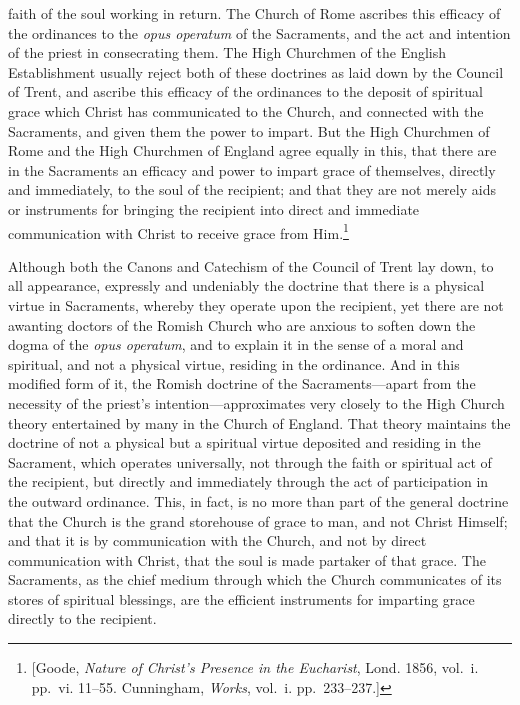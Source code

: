 \documentclass[english,]{book}
\begin{document}
faith of the soul working in return. The Church of Rome ascribes this efficacy of the ordinances to the \emph{opus operatum} of the Sacraments, and the act and intention of the priest in consecrating them. The High Churchmen of the English Establishment usually reject both of these doctrines as laid down by the Council of Trent, and ascribe this efficacy of the ordinances to the deposit of spiritual grace which Christ has communicated to the Church, and connected with the Sacraments, and given them the power to impart. But the High Churchmen of Rome and the High Churchmen of England agree equally in this, that there are in the Sacraments an efficacy and power to impart grace of themselves, directly and immediately, to the soul of the recipient; and that they are not merely aids or instruments for bringing the recipient into direct and immediate communication with Christ to receive grace from Him.\footnote{{[}Goode, \emph{Nature of Christ's Presence in the Eucharist}, Lond. 1856, vol.~i. pp.~vi. 11--55. Cunningham, \emph{Works}, vol.~i. pp.~233--237.{]}}

Although both the Canons and Catechism of the Council of Trent lay down, to all appearance, expressly and undeniably the doctrine that there is a physical virtue in Sacraments, whereby they operate upon the recipient, yet there are not awanting doctors of the Romish Church who are anxious to soften down the dogma of the \emph{opus operatum}, and to explain it in the sense of a moral and spiritual, and not a physical virtue, residing in the ordinance. And in this modified form of it, the Romish doctrine of the Sacraments---apart from the necessity of the priest's intention---approximates very closely to the High Church theory entertained by many in the Church of England. That theory maintains the doctrine of not a physical but a spiritual virtue deposited and residing in the Sacrament, which operates universally, not through the faith or spiritual act of the recipient, but directly and immediately through the act of participation in the outward ordinance. This, in fact, is no more than part of the general doctrine that the Church is the grand storehouse of grace to man, and not Christ Himself; and that it is by communication with the Church, and not by direct communication with Christ, that the soul is made partaker of that grace. The Sacraments, as the chief medium through which the Church communicates of its stores of spiritual blessings, are the efficient instruments for imparting grace directly to the recipient.
\end{document}
